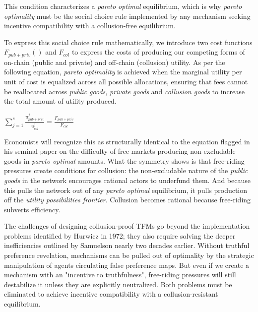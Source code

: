\documentclass[oneside]{article}   	%
\begin{document}
This condition characterizes a \textit{pareto optimal} equilibrium, which is why \textit{pareto optimality} must be the social choice rule implemented by any mechanism seeking incentive compatibility with a collusion-free equilibrium.

To express this social choice rule mathematically, we introduce two cost functions $F_{{pub} + {priv}}()$ and $F_{col}$ to express the costs of producing our competing forms of on-chain (public and private) and off-chain (collusion) utility. As per the following equation, \textit{pareto optimality} is achieved when the marginal utility per unit of cost is equalized across all possible allocations, ensuring that fees cannot be reallocated across \textit{public goods}, \textit{private goods} and \textit{collusion goods} to increase the total amount of utility produced.

\LARGE
\begin{adjustwidth}{1.5em}{1.5em}
\begin{math}
\sum_{j=1}^{s} \frac{u_{{pub}+{priv}}^j}{u_{col}^j} = \frac{F_{{pub} + {priv}}}{F_{col}}
\end{math}
\end{adjustwidth}
\normalsize

Economists will recognize this as structurally identical to the equation \cite{samuelson1954pure} flagged in his seminal paper on the difficulty of free markets producing non-excludable goods in \textit{pareto optimal} amounts. What the symmetry shows is that free-riding pressures create conditions for collusion: the non-excludable nature of the \textit{public goods} in the network encourages rational actors to underfund them. And because this pulls the network out of any \textit{pareto optimal} equilibrium, it pulls production off the \textit{utility possibilities frontier}. Collusion becomes rational because free-riding subverts efficiency.

The challenges of designing collusion-proof TFMs go beyond the implementation problems identified by Hurwicz in 1972; they also require solving the deeper inefficiencies outlined by Samuelson nearly two decades earlier. Without truthful preference revelation, mechanisms can be pulled out of optimality by the strategic manipulation of agents circulating false preference maps. But even if we create a mechanism with an "incentive to truthfulness", free-riding pressures will still destabilize it unless they are explicitly neutralized. Both problems must be eliminated to achieve incentive compatibility with a collusion-resistant equilibrium.
\end{document}

